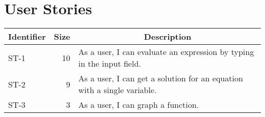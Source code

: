 \documentclass[letterpaper]{article}
\begin{document}
\section{User Stories}
\begin{tabular}{|l|r|l|}
\hline
\multicolumn{1}{|c|}{\textbf{Identifier}} & \multicolumn{1}{c|}{\textbf{Size}} & \multicolumn{1}{c|}{\textbf{Description}} \\ \hline
ST-1 & 10 & As a user, I can evaluate an expression by typing in the input field. \\ \hline
ST-2 & 9  & As a user, I can get a solution for an equation with a single variable. \\ \hline
ST-3 & 3  & As a user, I can graph a function. \\ \hline
\end{tabular}
\end{document}
